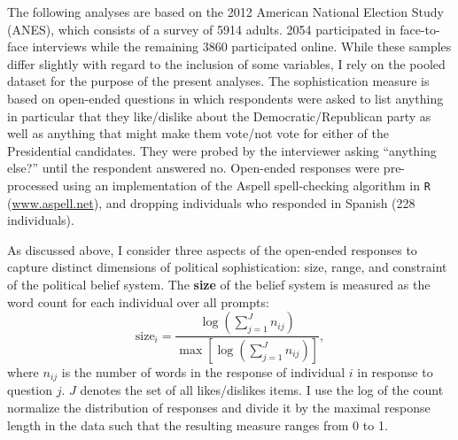 \documentclass[12pt]{article}
\begin{document}
The following analyses are based on the 2012 American National Election Study (ANES), which consists of a survey of 5914 adults. 2054 participated in face-to-face interviews while the remaining 3860 participated online. While these samples differ slightly with regard to the inclusion of some variables, I rely on the pooled dataset for the purpose of the present analyses. The sophistication measure is based on open-ended questions in which respondents were asked to list anything in particular that they like/dislike about the Democratic/Republican party as well as anything that might make them vote/not vote for either of the Presidential candidates. They were probed by the interviewer asking ``anything else?'' until the respondent answered no. Open-ended responses were pre-processed using an implementation of the Aspell spell-checking algorithm in \texttt{R} (\url{www.aspell.net}), and dropping individuals who responded in Spanish (228 individuals). 

As discussed above, I consider three aspects of the open-ended responses to capture distinct dimensions of political sophistication: size, range, and constraint of the political belief system. The \textbf{size} of the belief system is measured as the word count for each individual over all prompts:
\begin{equation}
\text{size}_i = \dfrac{\log\left(\sum_{j=1}^J n_{ij}\right)}{\max\left[\log\left(\sum_{j=1}^J n_{ij}\right)\right]},
\end{equation}
where $n_{ij}$ is the number of words in the response of individual $i$ in response to question $j$. $J$ denotes the set of all likes/dislikes items. I use the log of the count normalize the distribution of responses and divide it by the maximal response length in the data such that the resulting measure ranges from 0 to 1.
\end{document}
